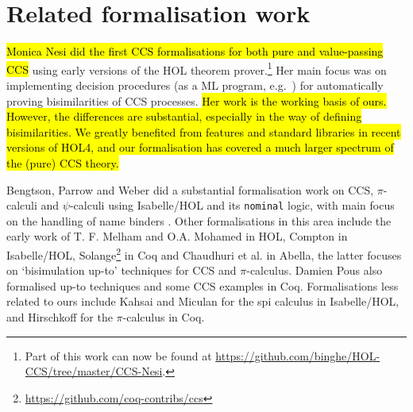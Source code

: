 \section{Related formalisation work}
\label{s:rel}

\hl{Monica Nesi did the first CCS formalisations for both pure and
value-passing CCS} \cite{Nesi:1992ve,Nesi:2017wo} using early versions of the HOL
theorem prover.\footnote{Part of this work can now be found at
  \url{https://github.com/binghe/HOL-CCS/tree/master/CCS-Nesi}.}
Her main focus was on implementing decision procedures (as a ML
program, e.g.~\cite{cleaveland1993concurrency}) for
automatically proving bisimilarities of CCS
processes. %
\hl{Her work is
  the working basis of ours. However, the differences are substantial, especially in the way of defining
bisimilarities. We greatly benefited from features and standard
libraries in recent versions of HOL4, and our formalisation has
covered a much larger spectrum of the (pure) CCS theory.}

Bengtson, Parrow and Weber did a substantial formalisation work
on CCS, $\pi$-calculi
and $\psi$-calculi 
using Isabelle/HOL and its \texttt{nominal} logic, with main focus on the handling of
name binders \cite{bengtson2010formalising,bengtson2007completeness,parrow2009formalising}.
%
Other formalisations in this area include the early work of T. F. Melham
\cite{melham1994mechanized} and O.A. Mohamed
\cite{mohamed1995mechanizing} in HOL, Compton
\cite{compton2005embedding} in Isabelle/HOL,
Solange\footnote{\url{https://github.com/coq-contribs/ccs}} in Coq
and Chaudhuri et al.\;\cite{chaudhuri2015lightweight} in Abella, the latter
focuses on `bisimulation up-to' techniques %
for CCS and $\pi$-calculus.
Damien Pous \cite{pous2007new} also formalised up-to techniques and some CCS examples in
Coq.
Formalisations less related to ours
include Kahsai and Miculan \cite{kahsai2008implementing} for the spi
calculus in Isabelle/HOL, and Hirschkoff \cite{hirschkoff1997full} for the $\pi$-calculus in Coq.
